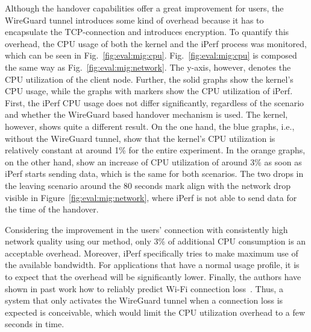 Although the handover capabilities offer a great improvement for users, the WireGuard tunnel introduces some kind of overhead because it has to encapsulate the TCP-connection and introduces encryption.
To quantify this overhead, the CPU usage of both the kernel and the iPerf process was monitored, which can be seen in Fig.~\ref{fig:eval:mig:cpu}.
Fig.~\ref{fig:eval:mig:cpu} is composed the same way as Fig.~\ref{fig:eval:mig:network}.
The y-axis, however, denotes the CPU utilization of the client node.
Further, the solid graphs show the kernel's CPU usage, while the graphs with markers show the CPU utilization of iPerf.
First, the iPerf CPU usage does not differ significantly, regardless of the scenario and whether the WireGuard based handover mechanism is used.
The kernel, however, shows quite a different result.
On the one hand, the blue graphs, i.e., without the WireGuard tunnel, show that the kernel's CPU utilization is relatively constant at around 1\% for the entire experiment.
In the orange graphs, on the other hand, show an increase of CPU utilization of around 3\% as soon as iPerf starts sending data, which is the same for both scenarios.
The two drops in the leaving scenario around the 80 seconds mark align with the network drop visible in Figure~\ref{fig:eval:mig:network}, where iPerf is not able to send data for the time of the handover.

Considering the improvement in the users' connection with consistently high network quality using our method, only 3\% of additional CPU consumption is an acceptable overhead.
Moreover, iPerf specifically tries to make maximum use of the available bandwidth.
For applications that have a normal usage profile, it is to expect that the overhead will be significantly lower.
Finally, the authors have shown in past work how to reliably predict Wi-Fi connection loss~\cite{hochst2019learning}.
Thus, a system that only activates the WireGuard tunnel when a connection loss is expected is conceivable, which would limit the CPU utilization overhead to a few seconds in time.
